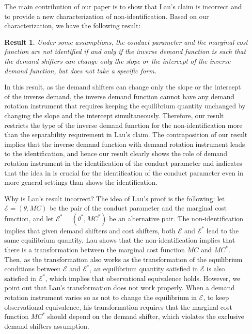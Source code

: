 \documentclass[11pt, a4paper]{article}
\newtheorem*{result*}{Result}
\begin{document}
The main contribution of our paper is to show that Lau's claim is incorrect and to provide a new characterization of non-identification.
Based on our characterization, we have the following result:
\begin{result*}\label{result:main}
    Under some assumptions, the conduct parameter and the marginal cost function are not identified if and only if the inverse demand function is such that the demand shifters can change only the slope or the intercept of the inverse demand function, but does not take a specific form.
\end{result*}
In this result, as the demand shifters can change only the slope or the intercept of the inverse demand, the inverse demand function cannot have any demand rotation instrument that requires keeping the equilibrium quantity unchanged by changing the slope and the intercept simultaneously.
Therefore, our result restricts the type of the inverse demand function for the non-identification more than the separability requirement in Lau's claim.
The contraposition of our result implies that the inverse demand function with demand rotation instrument leads to the identification, and hence our result clearly shows the role of demand rotation instrument in the identification of the conduct parameter and indicates
that the idea in \citet{bresnahanOligopoly1982} is crucial for the identification of the conduct parameter even in more general settings than \citet{bresnahanOligopoly1982} shows the identification.

Why is Lau's result incorrect?
The idea of Lau's proof is the following: let $\mathcal{E} = (\theta, MC)$ be the pair of the conduct parameter and the marginal cost function, and let $\mathcal{E}^{*} = (\theta^{*}, MC^{*})$ be an alternative pair.
The non-identification implies that given demand shifters and cost shifters, both $\mathcal{E}$ and $\mathcal{E}^{*}$ lead to the same equilibrium quantity.
Lau shows that the non-identification implies that there is a transformation between the marginal cost function $MC$ and $MC^{*}$.
Then, as the transformation also works as the transformation of the equilibrium conditions between $\mathcal{E}$ and $\mathcal{E}^{*}$, an equilibrium quantity satisfied in $\mathcal{E}$ is also satisfied in $\mathcal{E}^{*}$, which implies that observational equivalence holds.
However, we point out that Lau's transformation does not work properly.
When a demand rotation instrument varies so as not to change the equilibrium in $\mathcal{E}$, to keep observational equivalence, his transformation requires that the marginal cost function $MC^{*}$ should depend on the demand shifter, which violates the exclusive demand shifters assumption.
\end{document}
